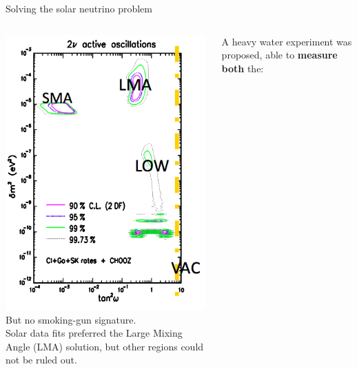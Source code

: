 \begin{frame}[t]{Solving the solar neutrino problem}

\begin{columns}
  \begin{column}{0.35\textwidth}
    \centering
     \includegraphics[width=0.99\textwidth]{./images/3nu/solar/contours_pre_sno.png}\\
     \vspace{0.1cm}
     {\scriptsize
     {\color{red}But no smoking-gun signature.}\\
     Solar data fits preferred the Large Mixing Angle (LMA) solution,
     but other regions could not be ruled out.\\
     }
  \end{column}
  \begin{column}{0.65\textwidth}
   {\small
     A heavy water experiment was proposed, able to {\bf measure both} the:
     \begin{itemize}

\end{itemize}}
\end{column}
\end{columns}
\end{frame}
